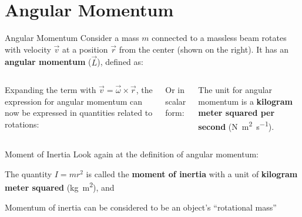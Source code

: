 \documentclass[12pt,compress,aspectratio=169]{beamer}
\begin{document}
\section{Angular Momentum}

\begin{frame}{Angular Momentum}
  Consider a mass $m$ connected to a massless beam rotates with velocity
  $\vec v$ at a position $\vec r$ from the center (shown on the right). It has
  an \textbf{angular momentum} ($\vec L$), defined as:
  \begin{columns}
    

    \vspace{-.1in}Expanding the term with $\vec v=\vec\omega\times\vec r$, the
    expression for angular momentum can now be expressed in quantities related
    to rotations:

    
    \vspace{-.2in}Or in scalar form:
    

    \vspace{-.2in}The unit for angular momentum is a
    \textbf{kilogram meter squared per second}
    (\si{\newton\metre\squared\per\second}).
    
  \end{columns}
\end{frame}



\begin{frame}{Moment of Inertia}
  Look again at the definition of angular momentum:
    
    
  The quantity $I=mr^2$ is called the \textbf{moment of inertia} with a unit of
  \textbf{kilogram meter squared} (\si{\kilo\gram\metre\squared}), and 


  Momentum of inertia can be considered to be an object's ``rotational mass''
\end{frame}
\end{document}
